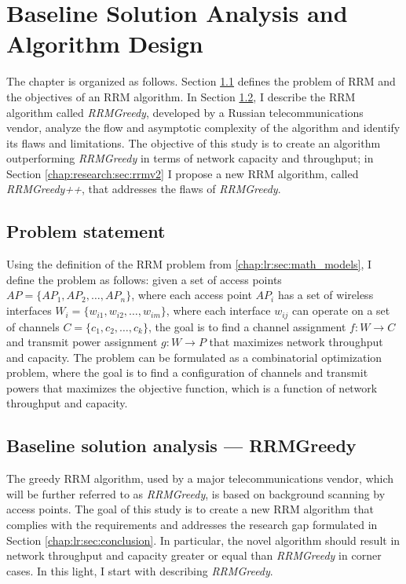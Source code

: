 \newcommand{\rrmG}{$\boldsymbol{G}$}

\chapter{Baseline Solution Analysis and Algorithm Design}
\label{chap:research}

The chapter is organized as follows. Section \ref{chap:research:sec:problem_statement} defines the problem of RRM and the objectives of an RRM algorithm.
In Section \ref{sec:baseline}, I describe the RRM algorithm called \textit{RRMGreedy}, developed by a Russian telecommunications vendor, analyze the flow and asymptotic complexity of the algorithm and identify its flaws and limitations. The objective of this study is to create an algorithm outperforming \textit{RRMGreedy} in terms of network capacity and throughput; in Section \ref{chap:research:sec:rrmv2} I propose a new RRM algorithm, called \textit{RRMGreedy++}, that addresses the flaws of \textit{RRMGreedy}.


\section{Problem statement}
\label{chap:research:sec:problem_statement}
Using the definition of the RRM problem from \ref{chap:lr:sec:math_models}, I define the problem as follows: given a set of access points $AP = \{AP_1, AP_2, \ldots, AP_n\}$, where each access point $AP_i$ has a set of wireless interfaces $W_i = \{w_{i1}, w_{i2}, \ldots, w_{im}\}$, where each interface $w_{ij}$ can operate on a set of channels $C = \{c_1, c_2, \ldots, c_k\}$, the goal is to find a channel assignment $f: W \to C$ and transmit power assignment $g: W \to P$ that maximizes network throughput and capacity. The problem can be formulated as a combinatorial optimization problem, where the goal is to find a configuration of channels and transmit powers that maximizes the objective function, which is a function of network throughput and capacity.

\section{Baseline solution analysis --- RRMGreedy}
\label{sec:baseline}
The greedy RRM algorithm, used by a major telecommunications vendor, which will be further referred to as \textit{RRMGreedy}, is based on background scanning by access points. The goal of this study is to create a new RRM algorithm that complies with the requirements and addresses the research gap formulated in Section \ref{chap:lr:sec:conclusion}.
In particular, the novel algorithm should result in network throughput and capacity greater or equal than \textit{RRMGreedy} in corner cases. In this light, I start with describing \textit{RRMGreedy}.

